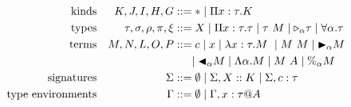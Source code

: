 \begin{align*}
    \textrm{kinds}             &  & K,J,I,H,G                & ::= * \mid \Pi x:\tau.K                                                           \\
    \textrm{types}             &  & \tau,\sigma,\rho,\pi,\xi & ::= X \mid \Pi x:\tau.\tau \mid \tau\ M \mid {\mathop{\triangleright}}_{\alpha} \tau \mid \forall\alpha.\tau \\
    \textrm{terms}             &  & M,N,L,O,P                & ::= c \mid x \mid \lambda x:\tau.M\ \mid M\ M \mid {\mathop{\blacktriangleright}}_\alpha M                   \\
                               &  &                          & \ \ \ \ \mid {\mathop{\blacktriangleleft}}_\alpha M \mid \Lambda\alpha.M \mid M\ A \mid \%_\alpha M        \\
    \textrm{signatures}         &  & \Sigma                   & ::= \emptyset \mid \Sigma, X::K \mid \Sigma, c:\tau                               \\
    \textrm{type environments} &  & \Gamma                   & ::= \emptyset \mid  \Gamma,x:\tau @A                                              \\
\end{align*}



